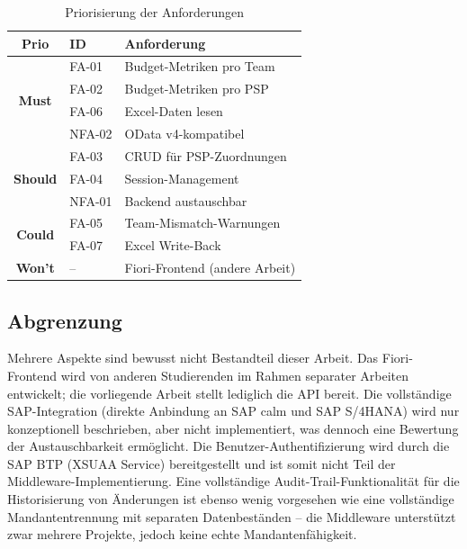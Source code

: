\begin{table}[H]
\centering
\caption{Priorisierung der Anforderungen}
\label{tab:priorisierung}
\begin{tabularx}{\textwidth}{cl>{\raggedright\arraybackslash}X}
\toprule
\textbf{Prio} & \textbf{ID} & \textbf{Anforderung} \\
\midrule
\multirow{4}{*}{\textbf{Must}} & FA-01 & Budget-Metriken pro Team \\
& FA-02 & Budget-Metriken pro PSP \\
& FA-06 & Excel-Daten lesen \\
& NFA-02 & OData v4-kompatibel \\
\midrule
\multirow{3}{*}{\textbf{Should}} & FA-03 & CRUD für PSP-Zuordnungen \\
& FA-04 & Session-Management \\
& NFA-01 & Backend austauschbar \\
\midrule
\multirow{2}{*}{\textbf{Could}} & FA-05 & Team-Mismatch-Warnungen \\
& FA-07 & Excel Write-Back \\
\midrule
\textbf{Won't} & -- & Fiori-Frontend (andere Arbeit) \\
\bottomrule
\end{tabularx}
\end{table}

\subsection{Abgrenzung}
\label{sec:abgrenzung}

Mehrere Aspekte sind bewusst nicht Bestandteil dieser Arbeit. Das Fiori-Frontend wird von anderen Studierenden im Rahmen separater Arbeiten entwickelt; die vorliegende Arbeit stellt lediglich die API bereit. Die vollständige SAP-Integration (direkte Anbindung an SAP \gls{calm} und SAP S/4HANA) wird nur konzeptionell beschrieben, aber nicht implementiert, was dennoch eine Bewertung der Austauschbarkeit ermöglicht. Die Benutzer-Authentifizierung wird durch die SAP BTP (XSUAA Service) bereitgestellt und ist somit nicht Teil der Middleware-Implementierung. Eine vollständige Audit-Trail-Funktionalität für die Historisierung von Änderungen ist ebenso wenig vorgesehen wie eine vollständige Mandantentrennung mit separaten Datenbeständen -- die Middleware unterstützt zwar mehrere Projekte, jedoch keine echte Mandantenfähigkeit.
